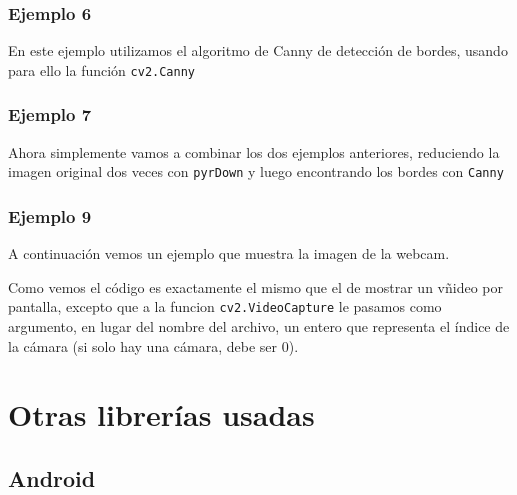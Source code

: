 \documentclass[a4paper,openright, 12pt]{book}
\begin{document}
\subsection*{Ejemplo 6}
En este ejemplo utilizamos el algoritmo de Canny \cite{canny86} de detección de bordes, usando para ello la función \lstinline|cv2.Canny|

\newpage 
\subsection*{Ejemplo 7}
Ahora simplemente vamos a combinar los dos ejemplos anteriores, reduciendo la imagen original dos veces con \lstinline|pyrDown| y luego encontrando los bordes con \lstinline|Canny|

\newpage
\subsection*{Ejemplo 9}
A continuación vemos un ejemplo que muestra la imagen de la webcam.

Como vemos el código es exactamente el mismo que el de mostrar un vñideo por pantalla, excepto que a la funcion \lstinline|cv2.VideoCapture| le pasamos como argumento, en lugar del nombre del archivo, un entero que representa el índice de la cámara (si solo hay una cámara, debe ser 0).
\newpage


\newpage
\chapter{Otras librerías usadas}
\section{Android}
\end{document}
